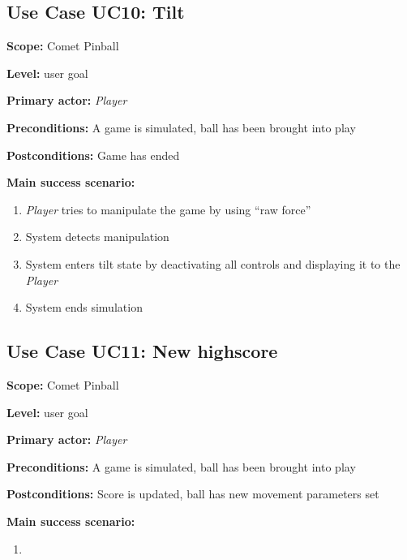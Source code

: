 \documentclass[fontsize=12pt,
               paper=a4,
               twoside=false,
               parskip=half,
               ]{scrartcl}
\begin{document}


\subsection{Use Case UC10: Tilt}

\textbf{\textsf{Scope:}} Comet Pinball

\textbf{\textsf{Level:}} user goal

\textbf{\textsf{Primary actor:}} \emph{Player}

\textbf{\textsf{Preconditions:}} A game is simulated, ball has been brought into play

\textbf{\textsf{Postconditions:}} Game has ended

\textbf{\textsf{Main success scenario:}}

\begin{enumerate}[leftmargin=3em]
	\item \emph{Player} tries to manipulate the game by using \enquote{raw force}
	\item System detects manipulation
	\item System enters tilt state by deactivating all controls and displaying it to the \emph{Player}
	\item System ends simulation
\end{enumerate}




\subsection{Use Case UC11: New highscore}

\textbf{\textsf{Scope:}} Comet Pinball

\textbf{\textsf{Level:}} user goal

\textbf{\textsf{Primary actor:}} \emph{Player}

\textbf{\textsf{Preconditions:}} A game is simulated, ball has been brought into play

\textbf{\textsf{Postconditions:}} Score is updated, ball has new movement parameters set

\textbf{\textsf{Main success scenario:}}

\begin{enumerate}[leftmargin=3em]
	\item 
\end{enumerate}
\end{document}
